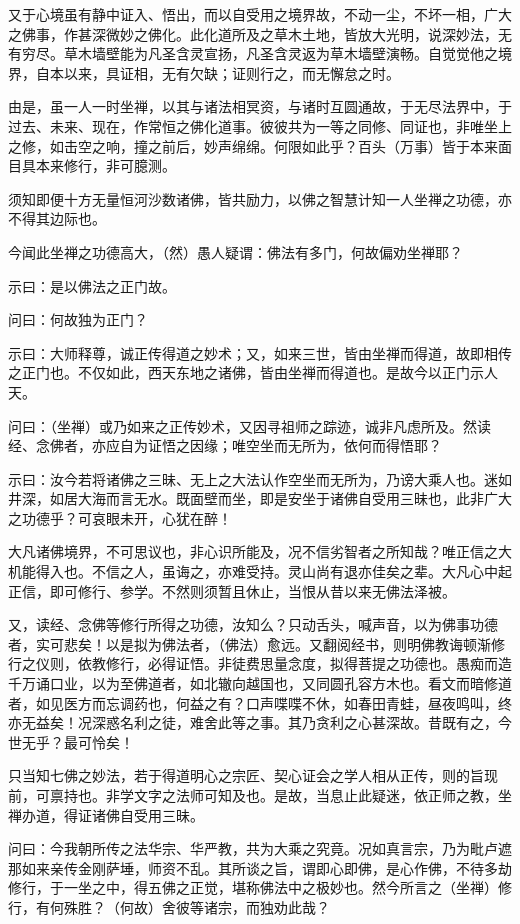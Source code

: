 又于心境虽有静中证入、悟出，而以自受用之境界故，不动一尘，不坏一相，广大之佛事，作甚深微妙之佛化。此化道所及之草木土地，皆放大光明，说深妙法，无有穷尽。草木墙壁能为凡圣含灵宣扬，凡圣含灵返为草木墙壁演畅。自觉觉他之境界，自本以来，具证相，无有欠缺；证则行之，而无懈怠之时。

由是，虽一人一时坐禅，以其与诸法相冥资，与诸时互圆通故，于无尽法界中，于过去、未来、现在，作常恒之佛化道事。彼彼共为一等之同修、同证也，非唯坐上之修，如击空之响，撞之前后，妙声绵绵。何限如此乎？百头（万事）皆于本来面目具本来修行，非可臆测。

须知即便十方无量恒河沙数诸佛，皆共励力，以佛之智慧计知一人坐禅之功德，亦不得其边际也。

今闻此坐禅之功德高大，（然）愚人疑谓：佛法有多门，何故偏劝坐禅耶？

示曰：是以佛法之正门故。

问曰：何故独为正门？

示曰：大师释尊，诚正传得道之妙术；又，如来三世，皆由坐禅而得道，故即相传之正门也。不仅如此，西天东地之诸佛，皆由坐禅而得道也。是故今以正门示人天。

问曰：（坐禅）或乃如来之正传妙术，又因寻祖师之踪迹，诚非凡虑所及。然读经、念佛者，亦应自为证悟之因缘；唯空坐而无所为，依何而得悟耶？

示曰：汝今若将诸佛之三昧、无上之大法认作空坐而无所为，乃谤大乘人也。迷如井深，如居大海而言无水。既面壁而坐，即是安坐于诸佛自受用三昧也，此非广大之功德乎？可哀眼未开，心犹在醉！

大凡诸佛境界，不可思议也，非心识所能及，况不信劣智者之所知哉？唯正信之大机能得入也。不信之人，虽诲之，亦难受持。灵山尚有退亦佳矣之辈。大凡心中起正信，即可修行、参学。不然则须暂且休止，当恨从昔以来无佛法泽被。

又，读经、念佛等修行所得之功德，汝知么？只动舌头，喊声音，以为佛事功德者，实可悲矣！以是拟为佛法者，（佛法）愈远。又翻阅经书，则明佛教诲顿渐修行之仪则，依教修行，必得证悟。非徒费思量念度，拟得菩提之功德也。愚痴而造千万诵口业，以为至佛道者，如北辙向越国也，又同圆孔容方木也。看文而暗修道者，如见医方而忘调药也，何益之有？口声喋喋不休，如春田青蛙，昼夜鸣叫，终亦无益矣！况深惑名利之徒，难舍此等之事。其乃贪利之心甚深故。昔既有之，今世无乎？最可怜矣！

只当知七佛之妙法，若于得道明心之宗匠、契心证会之学人相从正传，则的旨现前，可禀持也。非学文字之法师可知及也。是故，当息止此疑迷，依正师之教，坐禅办道，得证诸佛自受用三昧。

问曰：今我朝所传之法华宗、华严教，共为大乘之究竟。况如真言宗，乃为毗卢遮那如来亲传金刚萨埵，师资不乱。其所谈之旨，谓即心即佛，是心作佛，不待多劫修行，于一坐之中，得五佛之正觉，堪称佛法中之极妙也。然今所言之（坐禅）修行，有何殊胜？（何故）舍彼等诸宗，而独劝此哉？

